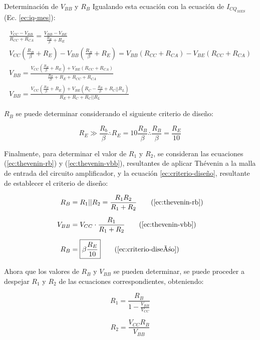 \begin{frame}[allowframebreaks]{Determinación de $V_{BB}$ y $R_B$}
Igualando esta ecuación con la ecuación de $I_{CQ_{MES}}$ (Ec. \ref{ec:iq-mes}):

\begin{gather}
    \frac{V_{CC}-V_{BB}}{R_{CC} + R_{CA}}= \frac{V_{BB}-V_{BE}}{\frac{R_B}{\beta}+R_E} \nonumber\\[6pt]
    V_{CC}(\frac{R_B}{\beta}+R_E) - V_{BB}(\frac{R_B}{\beta}+R_E) = V_{BB}(R_{CC}+R_{CA}) - V_{BE}(R_{CC}+R_{CA}) \nonumber\\[6pt]
    V_{BB} = \frac{V_{CC}(\frac{R_B}{\beta}+R_E) + V_{BE}(R_{CC}+R_{CA})}{\frac{R_B}{\beta}+R_E + R_{CC} + R_{CA}} \nonumber\\[6pt]
    V_{BB} = \frac{V_{CC}(\frac{R_B}{\beta}+R_E) + V_{BE}(R_C-\frac{R_B}{\beta}+R_C||R_L)}{R_E + R_C + R_C||R_L} \label{ec:vbb}
\end{gather}

$R_B$ se puede determinar considerando el siguiente criterio de diseño:

\begin{equation}
    R_E  \gg \frac{R_b}{\beta} \therefore R_E = 10\frac{R_B}{\beta} \therefore \frac{R_B}{\beta} = \frac{R_E}{10} \label{ec:criterio-diseño}
\end{equation}

Finalmente, para determinar el valor de $R_1$ y $R_2$, se consideran las ecuaciones (\ref{ec:thevenin-rb}) y (\ref{ec:thevenin-vbb}), resultantes de aplicar Thévenin a la malla de entrada del circuito 
amplificador, y la ecuación \ref{ec:criterio-diseño},
resultante de establecer el criterio de diseño:

\begin{align*}
    R_B &= R_1||R_2=\frac{R_1 R_2}{R_1 + R_2} \tag{\ref{ec:thevenin-rb}}\\[6pt]
    V_{BB} &= V_{CC} \cdot \frac{R_1}{R_1 + R_2} \tag{\ref{ec:thevenin-vbb}}\\[6pt]
    R_B &= \boxed{\beta \frac{R_E}{10}} \tag{\ref{ec:criterio-diseño}}
\end{align*}

Ahora que los valores de $R_B$ y $V_{BB}$ se pueden determinar, se puede proceder a 
despejar $R_1$ y  $R_2$ de las ecuaciones correspondientes, obteniendo:

\begin{figure}[!ht]
    \centering
    \begin{minipage}[][\textheight][]{0.45\textwidth}
    \begin{equation}
        \boxed{R_1 = \frac{R_B}{1-\frac{V_{BB}}{V_{CC}}}}
        \label{eq:r1}
    \end{equation}
    \end{minipage}
    \begin{minipage}[][\textheight][]{0.45\textwidth}
    \begin{equation}
        \boxed{R_2 = \frac{V_{CC}R_B}{V_{BB}}}
        \label{eq:r2}
    \end{equation}
    \end{minipage}
\end{figure}
\end{frame}

